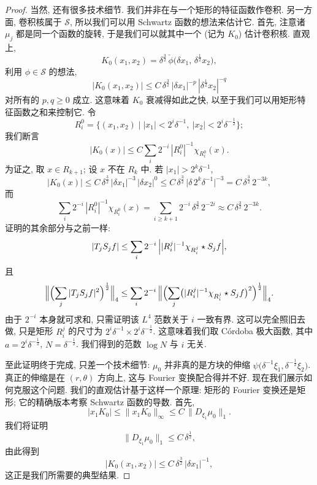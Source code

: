 \begin{proof}
当然, 还有很多技术细节. 我们并非在与一个矩形的特征函数作卷积. 另一方面, 卷积核属于 $\mathcal{S}$, 所以我们可以用 Schwartz 函数的想法来估计它. 首先, 注意诸 $\mu_j$ 都是同一个函数的旋转, 于是我们可以就其中一个 (记为 $K_0$) 估计卷积核. 直观上,
\[
K_{0}(x_{1},x_{2})=\delta^{\frac{3}{2}}\,\check{\phi}\bigl(\delta x_{1},\,\delta^{\frac{1}{2}}x_{2}\bigr),
\]
利用 $\phi\in\mathcal{S}$ 的想法,
\[
|K_{0}(x_{1},x_{2})|\leq C\,\delta^{\frac{3}{2}}\,|\delta x_{1}|^{-p}\,|\delta^{\frac{1}{2}}x_{2}|^{-q}
\]
对所有的 $p,q\geq 0$ 成立. 这意味着 $K_0$ 衰减得如此之快, 以至于我们可以用矩形特征函数之和来控制它. 令
\[
R_{i}^{0}=\{(x_{1},x_{2}) \mid |x_{1}|<2^{i}\delta^{-1},\ |x_{2}|<2^{i}\delta^{-\frac{1}{2}}\};
\]
我们断言
\[
|K_{0}(x)|\leq C\sum_{i}2^{-i}\,|R_{i}^{0}|^{-1}\chi_{R_{i}^{0}}(x).
\]
为证之, 取 $x\in R_{k+1}$; 设 $x$ 不在 $R_k$ 中. 若 $|x_1|>2^k\delta^{-1}$,
\[
|K_{0}(x)|\leq C\,\delta^{\frac{3}{2}}\,|\delta x_{1}|^{-3}\,|\delta x_{2}|^{0}
\leq C\,\delta^{\frac{3}{2}}\,\bigl|\delta\,2^{k}\delta^{-1}\bigr|^{-3}
=C\,\delta^{\frac{3}{2}}\,2^{-3k},
\]
而
\[
\sum_i 2^{-i}\,|R_{i}^{0}|^{-1}\chi_{R_{i}^{0}}(x)
=\sum_{i\geq k+1}2^{-i}\,\delta^{\frac{3}{2}}\,2^{-2i}
\approx C\,\delta^{\frac{3}{2}}\,2^{-3k}.
\]
证明的其余部分与之前一样:
\[
|T_{j}S_{j}f|\leq\sum_i 2^{-i}\,\Bigl||R_{i}^{j}|^{-1}\chi_{R_{i}^{j}}\star S_{j}f\Bigr|,
\]
且
\[
\Bigl\|\Bigl(\sum_j|T_{j}S_{j}f|^{2}\Bigr)^{\frac{1}{2}}\Bigr\|_{4}
\leq\sum_i 2^{-i}\,\Bigl\|\Bigl(\sum_j\bigl(|R_{i}^{j}|^{-1}\chi_{R_{i}^{j}}\star S_{j}f\bigr)^{2}\Bigr)^{\frac{1}{2}}\Bigr\|_{4}.
\]
由于 $2^{-i}$ 本身就可求和, 只需证明该 $L^{4}$ 范数关于 $i$ 一致有界. 这可以完全照旧去做, 只是矩形 $R_{i}^{j}$ 的尺寸为 $2^{i}\delta^{-1}\times2^{i}\delta^{-\frac{1}{2}}$. 这意味着我们取 C\'ordoba 极大函数, 其中 $a=2^{i}\delta^{-\frac{1}{2}}$, $N=\delta^{-\frac{1}{2}}$. 我们得到的范数 $\log N$ 与 $i$ 无关.

至此证明终于完成, 只差一个技术细节: $\mu_0$ 并非真的是方块的伸缩 $\psi\bigl(\delta^{-1}\xi_1,\delta^{-\frac{1}{2}}\xi_2\bigr)$. 真正的伸缩是在 $(r,\theta)$ 方向上, 这与 Fourier 变换配合得并不好. 现在我们展示如何克服这个问题. 我们的直观估计基于这样一个原理: 矩形的 Fourier 变换还是矩形; 它的精确版本考察 Schwartz 函数的导数. 首先,
\[
|x_{1}K_{0}|\leq\|x_{1}K_{0}\|_{\infty}\leq C\,\|D_{\xi_{1}}\mu_{0}\|_{1}.
\]
我们将证明
\[
\|D_{\xi_{1}}\mu_{0}\|_{1}\leq C\,\delta^{\frac{1}{2}},
\]
由此得到
\[
|K_{0}(x_{1},x_{2})|\leq C\,\delta^{\frac{3}{2}}\,|\delta x_{1}|^{-1},
\]
这正是我们所需要的典型结果.


\end{proof}
